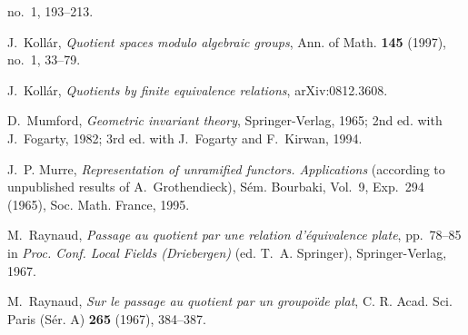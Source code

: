\begin{description}
  no.~1, 193--213.
\item[{[Ko97]}]\label{bib:sga3-V-Ko97} J.~Koll\'ar,
  \emph{Quotient spaces modulo algebraic groups}, Ann. of Math.
  \textbf{145} (1997), no.~1, 33--79.
\item[{[Ko08]}]\label{bib:sga3-V-Ko08} J.~Koll\'ar,
  \emph{Quotients by finite equivalence relations}, arXiv:0812.3608.
\item[{[Mum65]}]\label{bib:sga3-V-Mum65} D.~Mumford,
  \emph{Geometric invariant theory}, Springer-Verlag, 1965; 2nd ed.
  with J.~Fogarty, 1982; 3rd ed. with J.~Fogarty and F.~Kirwan, 1994.
\item[{[Mur65]}]\label{bib:sga3-V-Mur65} J.~P. Murre,
  \emph{Representation of unramified functors. Applications}
  (according to unpublished results of A.~Grothendieck), S\'em.
  Bourbaki, Vol.~9, Exp.~294 (1965), Soc. Math. France, 1995.
\item[{[Ray67a]}]\label{bib:sga3-V-Ray67a} M.~Raynaud,
  \emph{Passage au quotient par une relation d'\'equivalence plate},
  pp.~78--85 in \emph{Proc. Conf. Local Fields (Driebergen)}
  (ed. T.~A. Springer), Springer-Verlag, 1967.
\item[{[Ray67b]}]\label{bib:sga3-V-Ray67b} M.~Raynaud,
  \emph{Sur le passage au quotient par un groupo\"ide plat},
  C. R. Acad. Sci. Paris (S\'er. A) \textbf{265} (1967), 384--387.
\end{description}

